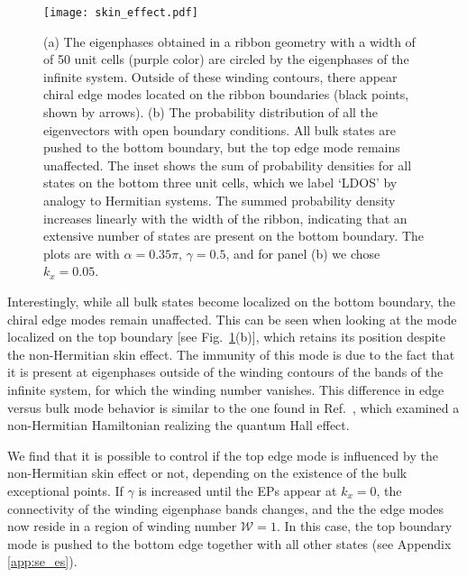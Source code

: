 \documentclass[aps,pra,reprint,superscriptaddress,showkeys,amsmath,amssymb,longbibliography]{revtex4-1}
\begin{document}
\begin{figure}
\centering
\texttt{[image: skin\_effect.pdf]}
\caption{(a) The eigenphases obtained in a ribbon geometry with a width of of 50 unit cells (purple color) are circled by the eigenphases of the infinite system. 
Outside of these winding contours, there appear chiral edge modes located on the ribbon boundaries (black points, shown by arrows). 
(b) The probability distribution of all the eigenvectors with open boundary conditions. 
All bulk states are pushed to the bottom boundary, but the top edge mode remains unaffected.
The inset shows the sum of probability densities for all states on the bottom three unit cells, which we label `LDOS' by analogy to Hermitian systems. 
The summed probability density increases linearly with the width of the ribbon, indicating that an extensive number of states are present on the bottom boundary.
The plots are with $\alpha=0.35\pi$, $\gamma=0.5$, and for panel (b) we chose $k_x=0.05$. 
\label{fig: skin_effect}}
\end{figure}

Interestingly, while all bulk states become localized on the bottom boundary, the chiral edge modes remain unaffected.
This can be seen when looking at the mode localized on the top boundary [see Fig.~\ref{fig: skin_effect}(b)], which retains its position despite the non-Hermitian skin effect.
The immunity of this mode is due to the fact that it is present at eigenphases outside of the winding contours of the bands of the infinite system, for which the winding number vanishes.
This difference in edge versus bulk mode behavior is similar to the one found in Ref.~\cite{Kawabata2018}, which examined a non-Hermitian Hamiltonian realizing the quantum Hall effect.

We find that it is possible to control if the top edge mode is influenced by the non-Hermitian skin effect or not, depending on the existence of the bulk exceptional points.
If $\gamma$ is increased until the EPs appear at $k_x=0$, the connectivity of the winding eigenphase bands changes, and the the edge modes now reside in a region of winding number $\mathcal{W}=1$.
In this case, the top boundary mode is pushed to the bottom edge together with all other states (see Appendix \ref{app:se_es}). 
\end{document}
